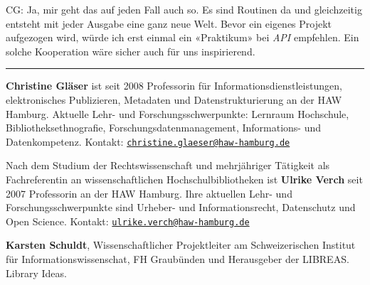 \documentclass[a4paper,
fontsize=11pt,
oneside,
numbers=noperiodatend,
parskip=half-,
bibliography=totoc,
final
]{scrartcl}
\begin{document}
CG: Ja, mir geht das auf jeden Fall auch so. Es sind Routinen da und
gleichzeitig entsteht mit jeder Ausgabe eine ganz neue Welt. Bevor ein
eigenes Projekt aufgezogen wird, würde ich erst einmal ein «Praktikum»
bei \emph{API} empfehlen. Ein solche Kooperation wäre sicher auch für
uns inspirierend.

\begin{center}\rule{0.5\linewidth}{0.5pt}\end{center}

\textbf{Christine Gläser} ist seit 2008 Professorin für
Informationsdienstleistungen, elektronisches Publizieren, Metadaten und
Datenstrukturierung an der HAW Hamburg. Aktuelle Lehr- und
Forschungsschwerpunkte: Lernraum Hochschule, Bibliotheksethnografie,
Forschungsdatenmanagement, Informations- und Datenkompetenz. Kontakt:
\href{mailto:christine.glaeser@haw-hamburg.de}{\nolinkurl{christine.glaeser@haw-hamburg.de}}

Nach dem Studium der Rechtswissenschaft und mehrjähriger Tätigkeit als
Fachreferentin an wissenschaftlichen Hochschulbibliotheken ist
\textbf{Ulrike Verch} seit 2007 Professorin an der HAW Hamburg. Ihre
aktuellen Lehr- und Forschungsschwerpunkte sind Urheber- und
Informationsrecht, Datenschutz und Open Science. Kontakt:
\href{mailto:ulrike.verch@haw-hamburg.de}{\nolinkurl{ulrike.verch@haw-hamburg.de}}

\textbf{Karsten Schuldt}, Wissenschaftlicher Projektleiter am
Schweizerischen Institut für Informationswissenschat, FH Graubünden und
Herausgeber der LIBREAS. Library Ideas.
\end{document}
